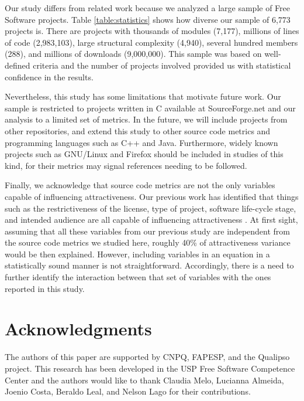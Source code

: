 \documentclass[conference]{IEEEtran}
\begin{document}
Our study differs from related work because we analyzed a large
sample of Free Software projects. Table \ref {table:statistics} shows how diverse our sample of
6,773 projects is. There are projects with thousands of modules (7,177),
millions of lines of code (2,983,103), large structural complexity (4,940),
several hundred members (288), and millions of downloads (9,000,000).
This sample was based on well-defined criteria and the number of projects
involved provided us with statistical confidence in the results.

Nevertheless, this study has some limitations that motivate future work.
%
Our sample is restricted to projects written in C available at
SourceForge.net and our analysis to a limited set of metrics.
In the future, we will include projects from other repositories, and extend
this study to other source code metrics and programming languages such as C++
and Java. 
%
Furthermore, widely known projects such as GNU/Linux and Firefox should be
included in studies of this kind, for their metrics may signal references
needing to be followed.

Finally, we acknowledge that source code metrics are not the only
variables capable of influencing attractiveness.
%
Our previous work has identified that things such as the restrictiveness of
the license, type of project, software life-cycle stage, and intended audience
are all capable of influencing attractiveness \cite{Santos2010}.
%
At first sight, assuming that all these variables from our previous study are
independent from the source code metrics we studied here, roughly 40\% of attractiveness variance would be then explained.
%
However, including variables in an equation in a statistically sound manner is not
straightforward. Accordingly, there is a need to further identify the interaction
between that set of variables with the ones reported in this study.

\section*{Acknowledgments}
The authors of this paper are supported by CNPQ, FAPESP, and the Qualipso project.
This research has been developed in the USP Free Software Competence Center and the
authors would like to thank Claudia Melo, Lucianna Almeida, Joenio Costa,
Beraldo Leal, and Nelson Lago for their contributions.



\end{document}
